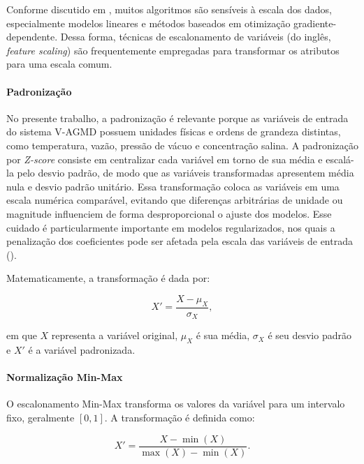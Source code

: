 Conforme discutido em \cite{Sarkar2018PML}, muitos algoritmos são sensíveis à escala dos dados, especialmente modelos lineares e métodos baseados em otimização gradiente-dependente. Dessa forma, técnicas de escalonamento de variáveis (do inglês, \textit{feature scaling}) são frequentemente empregadas para transformar os atributos para uma escala comum.

\paragraph{Padronização}

No presente trabalho, a padronização é relevante porque as variáveis de entrada do sistema V-AGMD possuem unidades físicas e ordens de grandeza distintas, como temperatura, vazão, pressão de vácuo e concentração salina. A padronização por \textit{Z-score} consiste em centralizar cada variável em torno de sua média e escalá-la pelo desvio padrão, de modo que as variáveis transformadas apresentem média nula e desvio padrão unitário. Essa transformação coloca as variáveis em uma escala numérica comparável, evitando que diferenças arbitrárias de unidade ou magnitude influenciem de forma desproporcional o ajuste dos modelos. Esse cuidado é particularmente importante em modelos regularizados, nos quais a penalização dos coeficientes pode ser afetada pela escala das variáveis de entrada (\cite{James2013ISL}).

Matematicamente, a transformação é dada por:

\begin{equation}
X' = \frac{X - \mu_X}{\sigma_X},
\label{eq:padronizacao_zscore}
\end{equation}

\noindent em que \(X\) representa a variável original, \(\mu_X\) é sua média, \(\sigma_X\) é seu desvio padrão e \(X'\) é a variável padronizada.

\paragraph{Normalização Min-Max}

O escalonamento Min-Max transforma os valores da variável para um intervalo fixo, geralmente \([0,1]\). A transformação é definida como:

\begin{equation}
X' = \frac{X - \min(X)}{\max(X) - \min(X)}.
\label{eq:normalizacao_minmax}
\end{equation}


